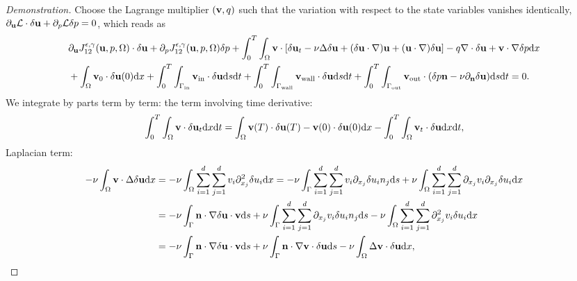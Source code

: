 \documentclass[oneside,11pt]{book}
\numberwithin{equation}{section}
\begin{document}
\begin{proof}[Demonstration]
    Choose the Lagrange multiplier $({\bf v},q)$ such that the variation with respect to the state variables vanishes identically, $\partial_{\bf u}\mathcal{L}\cdot\delta{\bf u} + \partial_p\mathcal{L}\delta p = 0$, which reads as
    \begin{align}
        &\partial_{\bf u}J_{12}^{\epsilon,\gamma}({\bf u},p,\Omega)\cdot\delta{\bf u} + \partial_pJ_{12}^{\epsilon,\gamma}({\bf u},p,\Omega)\delta p + \int_0^T\int_\Omega {\bf v}\cdot[\delta{\bf u}_t - \nu\Delta\delta{\bf u} + (\delta{\bf u}\cdot\nabla){\bf u} + ({\bf u}\cdot\nabla)\delta{\bf u}] - q\nabla\cdot\delta{\bf u} + {\bf v}\cdot\nabla\delta p{\rm d}x \nonumber\\
        &+ \int_\Omega {\bf v}_0\cdot\delta{\bf u}(0){\rm d}x + \int_0^T\int_{\Gamma_{\rm in}} {\bf v}_{\rm in}\cdot\delta{\bf u}{\rm d}s{\rm d}t + \int_0^T\int_{\Gamma_{\rm wall}} {\bf v}_{\rm wall}\cdot\delta{\bf u}{\rm d}s{\rm d}t + \int_0^T\int_{\Gamma_{\rm out}} {\bf v}_{\rm out}\cdot(\delta p{\bf n} - \nu\partial_{\bf n}\delta{\bf u}){\rm d}s{\rm d}t = 0.\label{1.4.2}
    \end{align}
    We integrate by parts term by term: the term involving time derivative:
    \begin{align}
        \int_0^T\int_\Omega {\bf v}\cdot\delta{\bf u}_t{\rm d}x{\rm d}t = \int_\Omega {\bf v}(T)\cdot\delta{\bf u}(T) - {\bf v}(0)\cdot\delta{\bf u}(0){\rm d}x - \int_0^T\int_\Omega {\bf v}_t\cdot\delta{\bf u}{\rm d}x{\rm d}t,
    \end{align}
    Laplacian term:
    \begin{align}
        -\nu\int_\Omega {\bf v}\cdot\Delta\delta{\bf u}{\rm d}x &= -\nu\int_\Omega \sum_{i=1}^d\sum_{j=1}^d v_i\partial_{x_j}^2\delta u_i{\rm d}x = -\nu\int_\Gamma \sum_{i=1}^d\sum_{j=1}^d v_i\partial_{x_j}\delta u_in_j{\rm d}s + \nu\int_\Omega \sum_{i=1}^d\sum_{j=1}^d \partial_{x_j}v_i\partial_{x_j}\delta u_i{\rm d}x\\
        &= -\nu\int_\Gamma {\bf n}\cdot\nabla\delta{\bf u}\cdot{\bf v}{\rm d}s + \nu\int_\Gamma \sum_{i=1}^d\sum_{j=1}^d \partial_{x_j}v_i\delta u_in_j{\rm d}s - \nu \int_\Omega \sum_{i=1}^d\sum_{j=1}^d \partial_{x_j}^2v_i\delta u_i{\rm d}x\\
        &= -\nu\int_\Gamma {\bf n}\cdot\nabla\delta{\bf u}\cdot{\bf v}{\rm d}s + \nu\int_\Gamma {\bf n}\cdot\nabla{\bf v}\cdot\delta{\bf u}{\rm d}s - \nu\int_\Omega \Delta{\bf v}\cdot\delta{\bf u}{\rm d}x,
    \end{align}

\end{proof}
\end{document}
